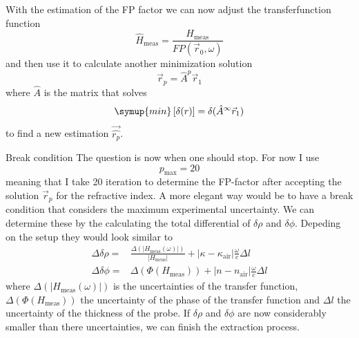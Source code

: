 \documentclass[aspectratio=1610, 9pt]{beamer}
\begin{document}
\begin{frame}
  With the estimation of the FP factor we can now adjust the transferfunction function 
  \begin{equation}
    \hat{H}_\text{meas} = \frac{H_\text{meas}}{FP(\vec{r}_0, \omega)}
  \end{equation}
  and then use it to calculate another minimization solution
  \begin{equation}
    \vec{r}_p = \hat{A}^p \vec{r}_1
  \end{equation}
  where $\hat{A}$ is the matrix that solves 
  \begin{equation}
    \symup{min} \left[ \delta(r)\right] = \delta(\hat{A}^\infty \vec{r}_1)
  \end{equation}
  to find a new estimation $\vec{\hat{r_p}}$.
\end{frame}

\begin{frame}{Break condition}
  The question is now when one should stop.
  For now I use 
  \begin{equation}
    p_\text{max} = 20
  \end{equation}
  meaning that I take 20 iteration to determine the FP-factor after accepting the solution $\vec{r}_p$ for the refractive index.
  A more elegant way would be to have a break condition that considers the maximum experimental uncertainty.
  We can determine these by the calculating the total differential of $\delta \rho$ and $\delta \phi$.
  Depeding on the setup they would look similar to 
  \begin{align}
    \Delta \delta \rho =& \frac{\Delta(\left|H_\text{meas}(\omega)\right|)}{\left|H_\text{meas}\right|} + \left|\kappa - \kappa_\text{air}\right| \frac{\omega}{c} \Delta l \\
    \Delta \delta \phi =& \Delta(\Phi(H_\text{meas})) + \left| n - n_\text{air} \right| \frac{\omega}{c} \Delta l
  \end{align}
  where $\Delta(\left|H_\text{meas}(\omega)\right|)$ is the uncertainties of the transfer function, $\Delta(\Phi(H_\text{meas}))$ the uncertainty of the phase of the transfer function and $\Delta l$ the uncertainty of the thickness of the probe.
  If $\delta \rho$ and $\delta \phi$ are now considerably smaller than there uncertainties, we can finish the extraction process.
\end{frame}
\end{document}
